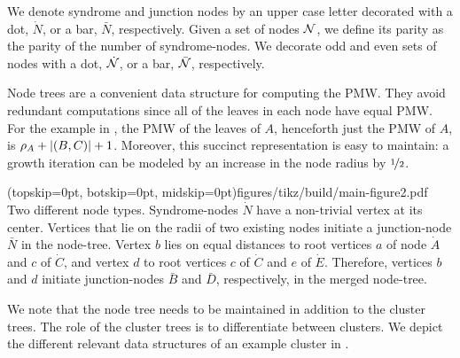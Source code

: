 We denote syndrome and junction nodes by an upper case letter decorated with a dot, $\dot{N}$, or a bar, $\bar{N}$, respectively. Given a set of nodes $\mathcal{N}$, we define its parity as the parity of the number of syndrome-nodes. We decorate odd and even sets of nodes with a dot, $\dot{\mathcal{N}}$, or a bar, $\bar{\mathcal{N}}$, respectively.


Node trees are a convenient data structure for computing the PMW. %
They avoid redundant computations since all of the leaves in each node have equal PMW. For the example in , the PMW of the leaves of $A$, henceforth just the PMW of $A$, is $\rho_A + \lvert(B,C)\rvert +1$. Moreover, this succinct representation is easy to maintain: a growth iteration can be modeled by an increase in the node radius by $\nicefrac{1}{2}$.

\Figure[bt](topskip=0pt, botskip=0pt, midskip=0pt){figures/tikz/build/main-figure2.pdf}{
Two different node types. Syndrome-nodes $\dot N$ have a non-trivial vertex at its center. Vertices that lie on the radii of two existing nodes initiate a junction-node $\bar{N}$ in the node-tree. Vertex $b$ lies on equal distances to root vertices $a$ of node $\dot{A}$ and $c$ of $\dot{C}$, and vertex $d$ to root vertices $c$ of $\dot{C}$ and $e$ of $\dot{E}$. Therefore, vertices $b$ and $d$ initiate junction-nodes $\bar{B}$ and $\bar{D}$, respectively, in the merged node-tree. \label{fig:nodes}}

We note that the node tree needs to be maintained in addition to the cluster trees. The role of the cluster trees is to differentiate between clusters.
We depict the different relevant data structures %
of an example cluster in . %

